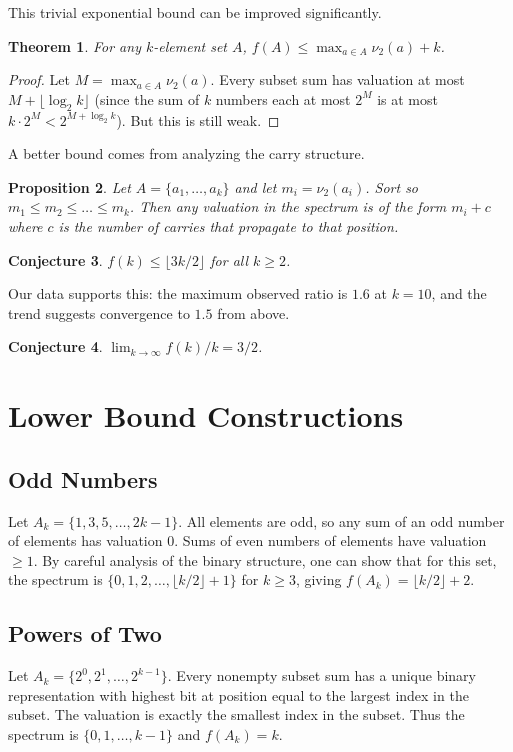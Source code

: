 \documentclass[11pt]{article}
\newtheorem{theorem}{Theorem}
\newtheorem{proposition}[theorem]{Proposition}
\newtheorem{conjecture}[theorem]{Conjecture}
\newcommand{\vtwo}{\nu_2}
\begin{document}
This trivial exponential bound can be improved significantly.

\begin{theorem}
For any $k$-element set $A$, $f(A) \le \max_{a \in A} \vtwo(a) + k$.
\end{theorem}
\begin{proof}
Let $M = \max_{a \in A} \vtwo(a)$. Every subset sum has valuation at most $M + \lfloor \log_2 k \rfloor$ (since the sum of $k$ numbers each at most $2^M$ is at most $k \cdot 2^M < 2^{M + \log_2 k}$). But this is still weak.
\end{proof}

A better bound comes from analyzing the carry structure.

\begin{proposition}
Let $A = \{a_1, \dots, a_k\}$ and let $m_i = \vtwo(a_i)$. Sort so $m_1 \le m_2 \le \dots \le m_k$. 
Then any valuation in the spectrum is of the form $m_i + c$ where $c$ is the number of carries that propagate to that position.
\end{proposition}

\begin{conjecture}
$f(k) \le \lfloor 3k/2 \rfloor$ for all $k \ge 2$.
\end{conjecture}

Our data supports this: the maximum observed ratio is $1.6$ at $k=10$, and the trend suggests convergence to $1.5$ from above.

\begin{conjecture}
$\lim_{k \to \infty} f(k)/k = 3/2$.
\end{conjecture}

\section{Lower Bound Constructions}

\subsection{Odd Numbers}
Let $A_k = \{1, 3, 5, \dots, 2k-1\}$. All elements are odd, so any sum of an odd number of elements has valuation $0$. Sums of even numbers of elements have valuation $\ge 1$. By careful analysis of the binary structure, one can show that for this set, the spectrum is $\{0, 1, 2, \dots, \lfloor k/2 \rfloor + 1\}$ for $k \ge 3$, giving $f(A_k) = \lfloor k/2 \rfloor + 2$.

\subsection{Powers of Two}
Let $A_k = \{2^0, 2^1, \dots, 2^{k-1}\}$. Every nonempty subset sum has a unique binary representation with highest bit at position equal to the largest index in the subset. The valuation is exactly the smallest index in the subset. Thus the spectrum is $\{0, 1, \dots, k-1\}$ and $f(A_k) = k$.
\end{document}
